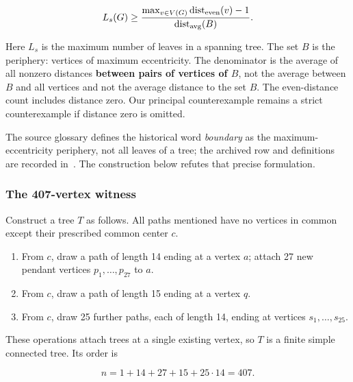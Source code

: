 \documentclass[11pt,a4paper]{article}
\theoremstyle{definition}\newtheorem{definition}[theorem]{Definition}
\theoremstyle{remark}\newtheorem{remark}[theorem]{Remark}
\begin{document}
\[L_s(G)\geq \frac{\max_{v\in V(G)}\operatorname{dist}_{\rm even}(v)-1}{\operatorname{dist}_{\rm avg}(B)}.\]

Here \(L_s\) is the maximum number of leaves in a spanning tree. The set
\(B\) is the periphery: vertices of maximum eccentricity. The
denominator is the average of all nonzero distances \textbf{between
pairs of vertices of \(B\)}, not the average between \(B\) and all
vertices and not the average distance to the set \(B\). The
even-distance count includes distance zero. Our principal counterexample
remains a strict counterexample if distance zero is omitted.

The source glossary defines the historical word \emph{boundary} as
the maximum-eccentricity periphery, not all leaves of a tree; the archived
row and definitions are recorded in~\cite{src:catalogue}.
The construction below refutes that precise formulation.

\subsubsection{The 407-vertex witness}\label{late:171:the-407-vertex-witness}

Construct a tree \(T\) as follows. All paths mentioned have no vertices
in common except their prescribed common center \(c\).

\begin{enumerate}
\def\labelenumi{\arabic{enumi}.}

\item
  From \(c\), draw a path of length 14 ending at a vertex \(a\); attach
  27 new pendant vertices \(p_1,\ldots,p_{27}\) to \(a\).
\item
  From \(c\), draw a path of length 15 ending at a vertex \(q\).
\item
  From \(c\), draw 25 further paths, each of length 14, ending at
  vertices \(s_1,\ldots,s_{25}\).
\end{enumerate}

These operations attach trees at a single existing vertex, so \(T\) is a
finite simple connected tree. Its order is

\[n=1+14+27+15+25\cdot14=407.\]
\end{document}
